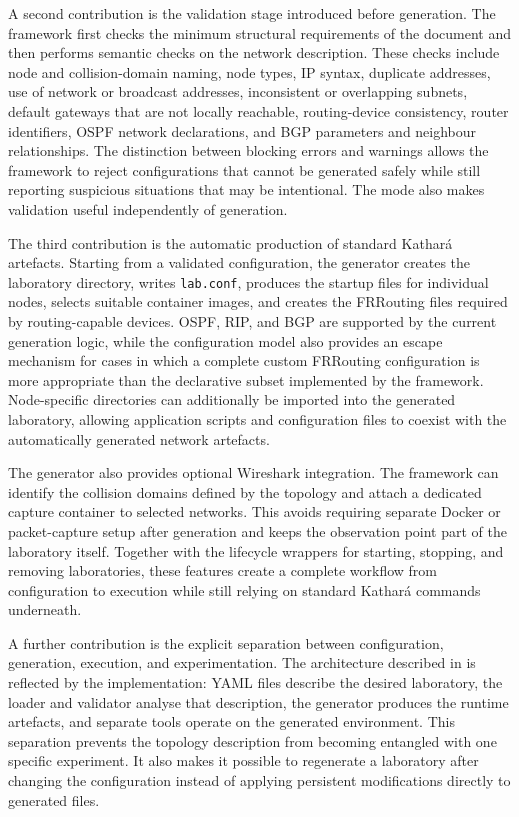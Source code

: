A second contribution is the validation stage introduced before generation.
The framework first checks the minimum structural requirements of the document
and then performs semantic checks on the network description. These checks
include node and collision-domain naming, node types, IP syntax, duplicate
addresses, use of network or broadcast addresses, inconsistent or overlapping
subnets, default gateways that are not locally reachable, routing-device
consistency, router identifiers, OSPF network declarations, and BGP parameters
and neighbour relationships. The distinction between blocking errors and
warnings allows the framework to reject configurations that cannot be generated
safely while still reporting suspicious situations that may be intentional.
The  mode also makes validation useful independently of
generation.

The third contribution is the automatic production of standard Kathar\'a
artefacts. Starting from a validated configuration, the generator creates the
laboratory directory, writes \texttt{lab.conf}, produces the startup files for
individual nodes, selects suitable container images, and creates the FRRouting
files required by routing-capable devices. OSPF, RIP, and BGP are supported by
the current generation logic, while the configuration model also provides an
escape mechanism for cases in which a complete custom FRRouting configuration
is more appropriate than the declarative subset implemented by the framework.
Node-specific directories can additionally be imported into the generated
laboratory, allowing application scripts and configuration files to coexist
with the automatically generated network artefacts.

The generator also provides optional Wireshark integration. The framework can
identify the collision domains defined by the topology and attach a dedicated
capture container to selected networks. This avoids requiring separate Docker
or packet-capture setup after generation and keeps the observation point part
of the laboratory itself. Together with the lifecycle wrappers for starting,
stopping, and removing laboratories, these features create a complete workflow
from configuration to execution while still relying on standard Kathar\'a
commands underneath.

A further contribution is the explicit separation between configuration,
generation, execution, and experimentation. The architecture described in
 is reflected by the implementation: YAML
files describe the desired laboratory, the loader and validator analyse that
description, the generator produces the runtime artefacts, and separate tools
operate on the generated environment. This separation prevents the topology
description from becoming entangled with one specific experiment. It also makes
it possible to regenerate a laboratory after changing the configuration instead
of applying persistent modifications directly to generated files.

